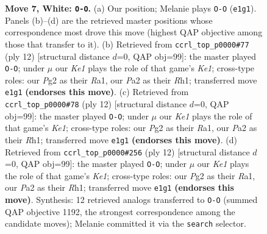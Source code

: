 \documentclass[11pt]{article}
\begin{document}
\begin{figure}[p]
\caption{\textbf{Move 7, White: \texttt{O-O}.} (a) Our position; Melanie plays \texttt{O-O} (\texttt{e1g1}). Panels (b)--(d) are the retrieved master positions whose correspondence most drove this move (highest QAP objective among those that transfer to it). (b) Retrieved from \texttt{ccrl\_top\_p0000\#77} (ply 12) [structural distance $d$=0, QAP obj=99]: the master played \texttt{O-O}; under $\mu$ our \emph{Ke1} plays the role of that game's \emph{Ke1}; cross-type roles: our \emph{P}g2 as their \emph{R}a1, our \emph{P}a2 as their \emph{R}h1; transferred move \texttt{e1g1} \textbf{(endorses this move)}. (c) Retrieved from \texttt{ccrl\_top\_p0000\#78} (ply 12) [structural distance $d$=0, QAP obj=99]: the master played \texttt{O-O}; under $\mu$ our \emph{Ke1} plays the role of that game's \emph{Ke1}; cross-type roles: our \emph{P}g2 as their \emph{R}a1, our \emph{P}a2 as their \emph{R}h1; transferred move \texttt{e1g1} \textbf{(endorses this move)}. (d) Retrieved from \texttt{ccrl\_top\_p0000\#256} (ply 12) [structural distance $d$=0, QAP obj=99]: the master played \texttt{O-O}; under $\mu$ our \emph{Ke1} plays the role of that game's \emph{Ke1}; cross-type roles: our \emph{P}g2 as their \emph{R}a1, our \emph{P}a2 as their \emph{R}h1; transferred move \texttt{e1g1} \textbf{(endorses this move)}. Synthesis: 12 retrieved analogs transferred to \texttt{O-O} (summed QAP objective 1192, the strongest correspondence among the candidate moves); Melanie committed it via the \texttt{search} selector.}
\label{fig:thought-m12}
\end{figure}

\clearpage
\end{document}
